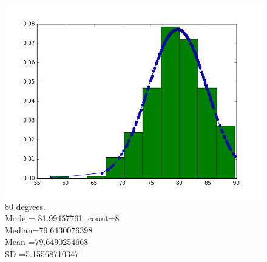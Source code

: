 \documentclass[12pt]{article}
\numberwithin{figure}{section}
\numberwithin{table}{section}
\begin{document}
\begin{figure}[H]
  \hfill
  \begin{minipage}[b]{0.4\textwidth}
    \includegraphics[width=\textwidth]{angle80.png}
    \caption[Estimation at angle 80 degrees]{80 degrees.
    \\\hspace{\textwidth}Mode   = 81.99457761, count=8
	\\\hspace{\textwidth}	Median=79.6430076398
	\\\hspace{\textwidth}	Mean   =79.6490254668
	\\\hspace{\textwidth}	SD       =5.15568710347 }
  \end{minipage}
\end{figure}
\end{document}

